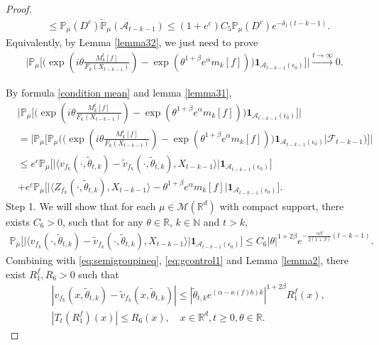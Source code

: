 \documentclass[12pt,oneside,english]{amsart}
\theoremstyle{plain}
\theoremstyle{definition}
\numberwithin{equation}{section}
\begin{document}
\begin{proof}
{\begin{align}
            &\leq \mathbb{P}_{\mu}(D^c)\mathbb{\tilde{P}}_{\mu}(\mathcal{A}_{t-k-1})\leq (1+e^c)C_5\mathbb{P}_{\mu}(D^c)e^{-\delta_1(t-k-1)}.
       \end{align}
       }
     Equivalently, by Lemma \ref{lemma32}, we just need to prove
     \begin{align}
        \Big|\mathbb{P}_{\mu}\Big[\big(\exp(i\theta \frac {M_k^t[f]}{F_k(X_{t-k-1})})-\exp(\theta^{1+\beta}e^{\alpha}m_k[f])\big)\mathbf{1}_{\mathcal{A}_{t-k-1}(\epsilon_0)}\Big]\Big|\xrightarrow{t\rightarrow\infty} 0.
    \end{align}

      By formula \eqref{condition mean} and lemma \ref{lemma31},
    \begin{align}
        &\Big|\mathbb{P}_{\mu}\Big[\big(\exp(i\theta \frac {M_k^t[f]}{F_k(X_{t-k-1})})-\exp(\theta^{1+\beta}e^{\alpha}m_k[f])\big)\mathbf{1}_{\mathcal{A}_{t-k-1}(\epsilon_0)}\Big]\Big|\\
        &=\Big|\mathbb{P}_{\mu}\Big[\mathbb{P}_{\mu}\Big(\big(\exp(i\theta \frac {M_k^t[f]}{F_k(X_{t-k-1})})-\exp(\theta^{1+\beta}e^{\alpha}m_k[f])\big)\mathbf{1}_{\mathcal{A}_{t-k-1}(\epsilon_0)}\Big|\mathscr{F}_{t-k-1}\Big)\Big]\Big|\\
        &\leq e^c\mathbb{P}_{\mu}\big[\big|\langle v_{f_k}(\cdot,\tilde{\theta}_{t,k})-\tilde{v}_{f_k}(\cdot,\tilde{\theta}_{t,k}), X_{t-k-1}\rangle\big|\mathbf{1}_{\mathcal{A}_{t-k-1}(\epsilon_0)}\big]\\
        \label{ineqinlem31}
        &+e^c\mathbb{P}_{\mu}\big[\big|\langle Z_{f_k}(\cdot,\tilde{\theta}_{t,k}),X_{t-k-1}\rangle-\theta^{1+\beta}e^{\alpha}m_k[f]\big|\mathbf{1}_{\mathcal{A}_{t-k-1}(\epsilon_0)}\big].
    \end{align}
Step 1.  We will show that for each $\mu \in\mathcal{M}(\mathbb{R}^d)$ with compact support, there exists $C_6>0$, such that for any $\theta\in \mathbb{R}$, $k\in\mathbb{N}$ and $t>k$,
    \begin{align}
    \label{lemma31q}
        \mathbb{P}_{\mu}\big[\big|\langle v_{f_k}(\cdot,\tilde{\theta}_{t,k})-\tilde{v}_{f_k}(\cdot,\tilde{\theta}_{t,k}), X_{t-k-1}\rangle\big|\mathbf{1}_{\mathcal{A}_{t-k-1}(\epsilon_0)}\big]\leq C_6|\theta|^{1+2\beta}e^{-\frac{\alpha\beta}{2(1+\beta)}(t-k-1)}.
    \end{align}
Combining with \eqref{eq:semigroupineq}, \eqref{eq:gcontrol1} and Lemma \ref{lemma2}, there exist $R_1^f,R_6>0$ such that
\begin{align}
    & |v_{f_k}(x,\tilde{\theta}_{t,k})-\tilde{v}_{f_k}(x,\tilde{\theta}_{t,k})|\leq |\tilde{\theta}_{t,k} e^{(\alpha-\kappa(f) b)k}|^{1+2\beta}R^f_1(x),\\
    & |T_t (R^f_1)(x)|\leq R_6(x), \quad x\in \mathbb{R}^d,t\geq 0, \theta \in \mathbb{R}.
\end{align}


\end{proof}
\end{document}
